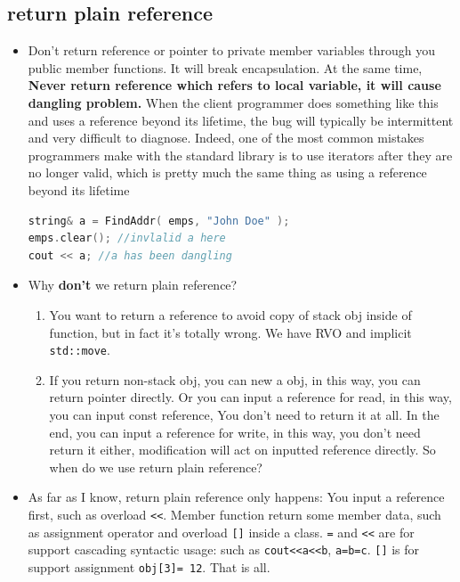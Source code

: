 \documentclass[a4paper,11pt,twoside]{book}
\begin{document}
\subsection{return plain reference} 
\begin{itemize}
	
	\item Don't return reference or pointer to private member variables through you public member functions. It will break encapsulation. At the same time, \textbf{Never return reference which refers to local variable, it will cause dangling problem.} When the client programmer does something like this and uses a reference beyond its lifetime, the bug will typically be intermittent and very difficult to diagnose. Indeed, one of the most common mistakes programmers make with the standard library is to use iterators after they are no longer valid, which is pretty much the same thing as using a reference beyond its lifetime
	
\begin{lstlisting}[frame=single, language=c++, mathescape=true]
string& a = FindAddr( emps, "John Doe" );
emps.clear(); //invlalid a here
cout << a; //a has been dangling  
\end{lstlisting}
	
	\item Why \textbf{don't} we return plain reference?
	\begin{enumerate}
		\item You want to return a reference to avoid copy of stack obj inside of function, but in fact it's totally wrong. We have RVO and implicit \texttt{std::move}.
	
		\item If you return non-stack obj, you can new a obj, in this way, you can return pointer directly. Or you can input a reference for read, in this way, you can input const reference, You don't need to return it at all. In the end, you can input a reference for write, in this way, you don't need return it either, modification will act on inputted reference directly. So when do we use return plain reference?
	\end{enumerate}
	
	
	\item As far as I know, return plain reference only happens: You input a reference first, such as overload \verb=<<=. Member function return some member data, such as  assignment operator and overload \verb=[]= inside a class. \texttt{=} and \texttt{<<} are for support cascading syntactic usage: such as \texttt{cout<<a<<b}, \texttt{a=b=c}.  \texttt{[]} is for support assignment \texttt{obj[3]= 12}.  That is all.


\end{itemize}
\end{document}
